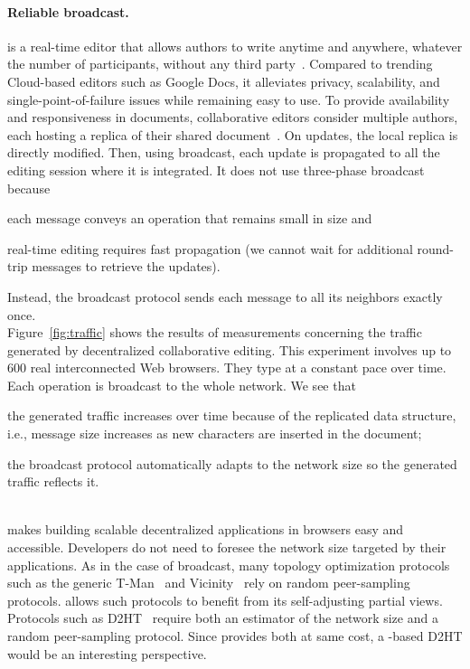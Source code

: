 \paragraph{Reliable broadcast.} \CRATE is a real-time editor that allows authors
to write anytime and anywhere, whatever the number of participants, without any
third party~\cite{nedelec2016crate}. Compared to trending Cloud-based editors
such as Google Docs, it alleviates privacy, scalability, and
single-point-of-failure issues while remaining easy to use.  To provide
availability and responsiveness in documents, collaborative editors consider
multiple authors, each hosting a replica of their shared
document~\cite{saito2005optimistic}.  On updates, the local replica is directly
modified. Then, using broadcast, each update is propagated to all the editing
session where it is integrated.  It does not use three-phase broadcast because
\begin{inparaenum}[(i)]
\item each message conveys an operation that remains small in size and
\item real-time editing requires fast propagation (we cannot wait for additional
  round-trip messages to retrieve the updates).
\end{inparaenum} Instead, the broadcast protocol sends each message to all its
neighbors exactly once. \\
Figure~\ref{fig:traffic} shows the results of measurements concerning the
traffic generated by decentralized collaborative editing. This experiment
involves up to 600 real interconnected Web browsers. They type at a constant
pace over time. Each operation is broadcast to the whole network. We see that
\begin{inparaenum}
\item the generated traffic increases over time because of the replicated data
  structure, i.e., message size increases as new characters are inserted in the
  document;
\item the broadcast protocol automatically adapts to the network size so the
  generated traffic reflects it.
\end{inparaenum}

\ \\

\SPRAY makes building scalable decentralized applications in browsers
easy and accessible.  Developers do not need to foresee the network
size targeted by their applications. As in the case of broadcast, many
topology optimization protocols such as the generic
T-Man~\cite{jelasity2009tman} and
Vicinity~\cite{voulgaris2005epidemic} rely on random peer-sampling
protocols. \SPRAY allows such protocols to benefit from its
self-adjusting partial views. Protocols such as
D2HT~\cite{bertier-d2ht} require both an estimator of the network size
and a random peer-sampling protocol. Since \SPRAY provides both at
same cost, a \SPRAY-based D2HT would be an interesting perspective.

